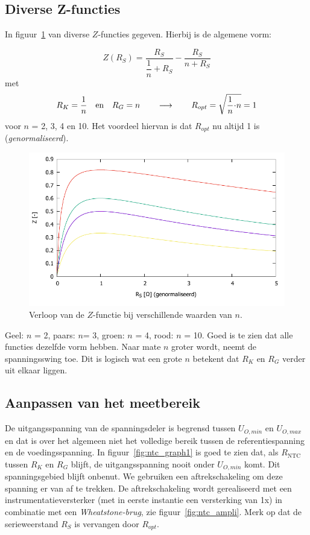 \documentclass[12pt,a4paper,final,twoside,fleqn]{article}
\newcommand{\rntc}{R_\text{NTC}}
\newcommand{\ropt}{R_{opt}}
\let\oldcdot\cdot
\renewcommand{\cdot}{\kern-.10em\oldcdot\kern-.10em}
\begin{document}
\subsection{Diverse Z-functies}
In figuur~\ref{fig:spanningsswings} van diverse $Z$-functies gegeven. Hierbij is
de algemene vorm:

\begin{equation}
Z(R_S) = \dfrac{R_S}{\dfrac{1}{n}+R_S} - \dfrac{R_S}{n+R_S}
\end{equation}
met
\begin{equation}
R_K = \dfrac{1}{n}\quad\text{en}\quad R_G = n \qquad\longrightarrow\qquad
\ropt = \sqrt{\dfrac{1}{n}\cdot n} = 1
\end{equation}
voor $n$ = 2, 3, 4 en 10. Het voordeel hiervan is dat $\ropt$ nu altijd 1 is
(\textsl{genormaliseerd}).

\begin{figure}[ht!]
\centering
\includegraphics[scale=1]{gnuplot/spanningsswings}
\caption{Verloop van de $Z$-functie bij verschillende waarden van $n$.}
\label{fig:spanningsswings}
\end{figure}
 
Geel: $n$ = 2, paars: $n $= 3, groen: $n$ = 4, rood: $n$ = 10. Goed is te zien
dat alle functies dezelfde vorm hebben. Naar mate $n$ groter wordt, neemt de
spanningsswing toe. Dit is logisch wat een grote $n$ betekent dat $R_K$ en $R_G$
verder uit elkaar liggen.

\subsection{Aanpassen van het meetbereik}
De uitgangsspanning van de spanningsdeler is begrensd tussen $U_{O,min}$ en $U_{O,max}$
en dat is over het algemeen niet het volledige bereik tussen de referentiespanning en
de voedingsspanning.
In figuur~\ref{fig:ntc_graph1} is goed te zien dat, als $\rntc$ tussen $R_K$ en $R_G$
blijft, de uitgangsspanning nooit onder $U_{O,min}$ komt. Dit spanningsgebied blijft
onbenut. We gebruiken een aftrekschakeling om deze spanning er van af te trekken. De
aftrekschakeling wordt gerealiseerd met een instrumentatieversterker (met in eerste
instantie een versterking van 1x) in combinatie met een \textsl{Wheatstone-brug}, zie
figuur~\ref{fig:ntc_ampli}. Merk op dat de serieweerstand $R_S$ is vervangen door
$\ropt$.
\end{document}
